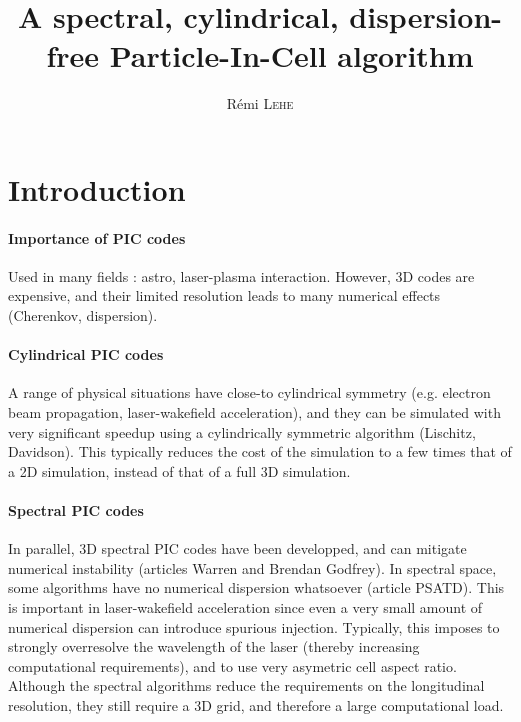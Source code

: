 \documentclass[a4paper]{article}   	%
\title{A spectral, cylindrical, dispersion-free Particle-In-Cell algorithm}
\date{}
\author{R\'emi \textsc{Lehe}}
\begin{document}
\maketitle


\section*{Introduction}

\paragraph{Importance of PIC codes } Used in many fields : astro, laser-plasma interaction. However, 3D codes are expensive, and their limited resolution leads to many numerical effects (Cherenkov, dispersion).

\paragraph{Cylindrical PIC codes} A range of physical situations have close-to cylindrical symmetry (e.g. electron beam propagation, laser-wakefield acceleration), and they can be simulated with very significant speedup using a cylindrically symmetric algorithm (Lischitz, Davidson). This typically reduces the cost of the simulation to a few times that of a 2D simulation, instead of that of a full 3D simulation.

\paragraph{Spectral PIC codes} In parallel, 3D spectral PIC codes have been developped, and can mitigate numerical instability (articles Warren and Brendan Godfrey). In spectral space, some algorithms have no numerical dispersion whatsoever (article PSATD). This is important in laser-wakefield acceleration since even a very small amount of numerical dispersion can introduce spurious injection. Typically, this imposes to strongly overresolve the wavelength of the laser (thereby increasing computational requirements), and to use very asymetric cell aspect ratio. Although the spectral algorithms reduce the requirements on the longitudinal resolution, they still require a 3D grid, and therefore a large computational load.
\end{document}
